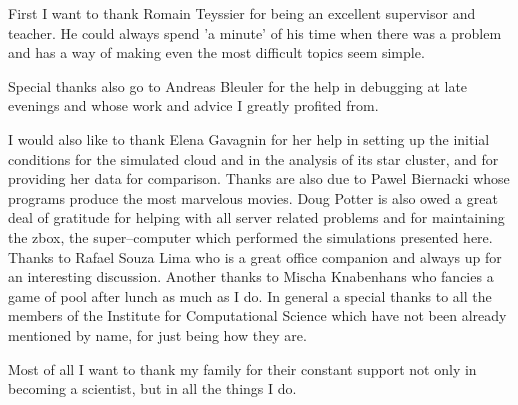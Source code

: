 \documentclass[
10pt,
english,
singlespacing,
headsepline,
]{MastersDoctoralThesis}
\begin{document}

\begin{acknowledgements}
 \addchaptertocentry{\acknowledgementname} %
 \vspace{1cm}
 First I want to thank Romain Teyssier for being an excellent supervisor and teacher.
 He could always spend 'a minute' of his time when there was a problem and has a way of making even the most difficult topics seem simple.

 Special thanks also go to Andreas Bleuler for the help in debugging at late evenings and whose work and advice I greatly profited from.

 I would also like to thank Elena Gavagnin for her help in setting up the initial conditions for the simulated cloud and in the analysis of its star cluster, and for providing her data for comparison.
 Thanks are also due to Pawel Biernacki whose programs produce the most marvelous movies.
 Doug Potter is also owed a great deal of gratitude for helping with all server related problems and for maintaining the zbox, the super--computer which performed the simulations presented here.
 Thanks to Rafael Souza Lima who is a great office companion and always up for an interesting discussion.
 Another thanks to Mischa Knabenhans who fancies a game of pool after lunch as much as I do.
 In general a special thanks to all the members of the Institute for Computational Science which have not been already mentioned by name, for just being how they are.

 Most of all I want to thank my family for their constant support not only in becoming a scientist, but in all the things I do.

\end{acknowledgements}


\tableofcontents %

\listoffigures %
\end{document}
